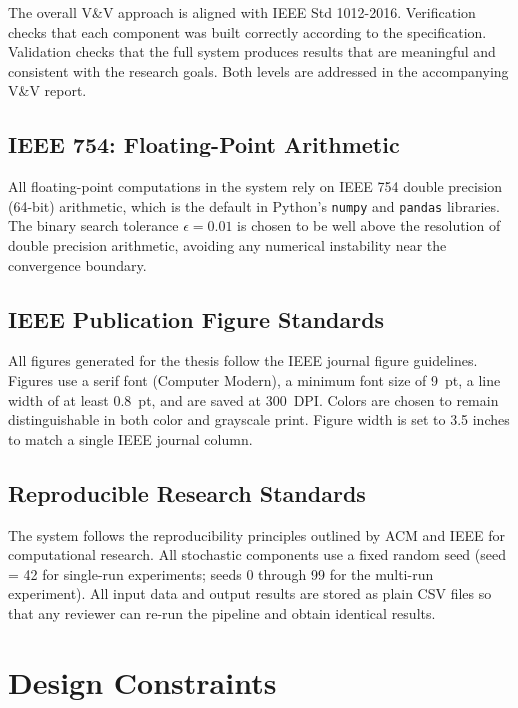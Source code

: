 \documentclass[12pt,a4paper]{article}
\begin{document}
The overall V\&V approach is aligned with IEEE Std 1012-2016. Verification
checks that each component was built correctly according to the specification.
Validation checks that the full system produces results that are meaningful
and consistent with the research goals. Both levels are addressed in the
accompanying V\&V report.

\subsection{IEEE 754: Floating-Point Arithmetic}

All floating-point computations in the system rely on IEEE 754 double
precision (64-bit) arithmetic, which is the default in Python's
\texttt{numpy} and \texttt{pandas} libraries. The binary search tolerance
$\epsilon = 0.01$ is chosen to be well above the resolution of double
precision arithmetic, avoiding any numerical instability near the convergence
boundary.

\subsection{IEEE Publication Figure Standards}

All figures generated for the thesis follow the IEEE journal figure
guidelines. Figures use a serif font (Computer Modern), a minimum font size
of 9~pt, a line width of at least 0.8~pt, and are saved at 300~DPI. Colors
are chosen to remain distinguishable in both color and grayscale print.
Figure width is set to 3.5 inches to match a single IEEE journal column.

\subsection{Reproducible Research Standards}

The system follows the reproducibility principles outlined by ACM and IEEE
for computational research. All stochastic components use a fixed random
seed (seed = 42 for single-run experiments; seeds 0 through 99 for the
multi-run experiment). All input data and output results are stored as
plain CSV files so that any reviewer can re-run the pipeline and obtain
identical results.

\section{Design Constraints}
\end{document}
